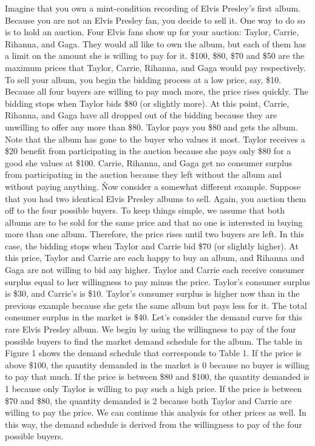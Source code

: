 Imagine that you own a mint-condition recording of Elvis Presley's first album. Because you are not an Elvis Presley
fan, you decide to sell it. One way to do so is to hold an auction. Four Elvis fans show up for your auction: Taylor,
Carrie, Rihanna, and Gaga. They would all like to own the album, but each of them has a limit on the amount she is
willing to pay for it. \$100, \$80, \$70 and \$50 are the maximum prices that Taylor, Carrie, Rihanna, and Gaga would
pay respectively. To sell your album, you begin the bidding process at a low price, say, \$10. Because all four
buyers are willing to pay much more, the price rises quickly. The bidding stops when Taylor bids \$80 (or slightly
more). At this point, Carrie, Rihanna, and Gaga have all dropped out of the bidding because they are unwilling to
offer any more than \$80. Taylor pays you \$80 and gets the album. Note that the album has gone to the buyer who
values it most. Taylor receives a \$20 benefit from participating in the auction because she pays only \$80 for a
good she values at \$100. Carrie, Rihanna, and Gaga get no consumer surplus from participating in the auction because
they left without the album and without paying anything. \v

Now consider a somewhat different example. Suppose that you had two identical Elvis Presley albums to sell. Again,
you auction them off to the four possible buyers. To keep things simple, we assume that both albums are to be sold
for the same price and that no one is interested in buying more than one album. Therefore, the price rises until two
buyers are left. In this case, the bidding stops when Taylor and Carrie bid \$70 (or slightly higher). At this price,
Taylor and Carrie are each happy to buy an album, and Rihanna and Gaga are not willing to bid any higher. Taylor and
Carrie each receive consumer surplus equal to her willingness to pay minus the price. Taylor's consumer surplus is
\$30, and Carrie's is \$10. Taylor's consumer surplus is higher now than in the previous example because she gets the
same album but pays less for it. The total consumer surplus in the market is \$40. \v

Let's consider the demand curve for this rare Elvis Presley album. We begin by using the willingness to pay of the
four possible buyers to find the market demand schedule for the album. The table in Figure 1 shows the demand
schedule that corresponds to Table 1. If the price is above \$100, the quantity demanded in the market is 0 because
no buyer is willing to pay that much. If the price is between \$80 and \$100, the quantity demanded is 1 because only
Taylor is willing to pay such a high price. If the price is between \$70 and \$80, the quantity demanded is 2 because
both Taylor and Carrie are willing to pay the price. We can continue this analysis for other prices as well. In this
way, the demand schedule is derived from the willingness to pay of the four possible buyers.

